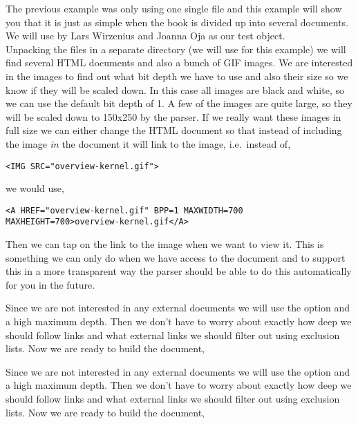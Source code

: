 The previous example was only using one single file and this example
will show you that it is just as simple when the book is divided up
into several documents. We will use  by Lars Wirzenius and Joanna Oja as our test object.\\

Unpacking the files in a separate directory (we will use 
for this example) we will find several HTML documents and also a bunch
of GIF images. We are interested in the images to find out what bit
depth we have to use and also their size so we know if they will be
scaled down. In this case all images are black and white, so we can
use the default bit depth of 1. A few of the images are quite large,
so they will be scaled down to 150x250 by the parser. If we really
want these images in full size we can either change the HTML document
so that instead of including the image \emph{in} the document it will
link to the image, i.e.\ instead of,

\begin{verbatim}
<IMG SRC="overview-kernel.gif">
\end{verbatim}

we would use,

\begin{verbatim}
<A HREF="overview-kernel.gif" BPP=1 MAXWIDTH=700 MAXHEIGHT=700>overview-kernel.gif</A>
\end{verbatim}

Then we can tap on the link to the image when we want to view it.
This is something we can only do when we have access to the document
and to support this in a more transparent way the parser should be
able to do this automatically for you in the future.\\

\begin{latexonly}
Since we are not interested in any external documents we will use the
 option and a high maximum depth.
Then we don't have to worry about exactly how deep we should follow
links and what external links we should filter out using exclusion lists.
Now we are ready to build the document,\\

\end{latexonly}
\begin{htmlonly}
Since we are not interested in any external documents we will use the
 option and a high maximum depth.
Then we don't have to worry about exactly how deep we should follow
links and what external links we should filter out using exclusion lists.
Now we are ready to build the document,

\end{htmlonly}\\

